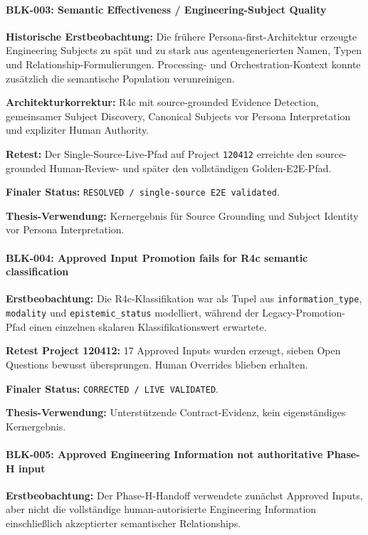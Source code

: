 \paragraph{BLK-003: Semantic Effectiveness / Engineering-Subject Quality}

\textbf{Historische Erstbeobachtung:}
Die frühere Persona-first-Architektur erzeugte Engineering Subjects zu spät und
zu stark aus agentengenerierten Namen, Typen und Relationship-Formulierungen.
Processing- und Orchestration-Kontext konnte zusätzlich die semantische Population
verunreinigen.

\textbf{Architekturkorrektur:}
R4c mit source-grounded Evidence Detection, gemeinsamer Subject Discovery,
Canonical Subjects vor Persona Interpretation und expliziter Human Authority.

\textbf{Retest:}
Der Single-Source-Live-Pfad auf Project \texttt{120412} erreichte den
source-grounded Human-Review- und später den vollständigen Golden-E2E-Pfad.

\textbf{Finaler Status:}
\texttt{RESOLVED / single-source E2E validated}.

\textbf{Thesis-Verwendung:}
Kernergebnis für Source Grounding und Subject Identity vor Persona Interpretation.


\paragraph{BLK-004: Approved Input Promotion fails for R4c semantic classification}

\textbf{Erstbeobachtung:}
Die R4c-Klassifikation war als Tupel aus \texttt{information_type},
\texttt{modality} und \texttt{epistemic_status} modelliert, während der
Legacy-Promotion-Pfad einen einzelnen skalaren Klassifikationswert erwartete.

\textbf{Retest Project 120412:}
17 Approved Inputs wurden erzeugt, sieben Open Questions bewusst übersprungen.
Human Overrides blieben erhalten.

\textbf{Finaler Status:}
\texttt{CORRECTED / LIVE VALIDATED}.

\textbf{Thesis-Verwendung:}
Unterstützende Contract-Evidenz, kein eigenständiges Kernergebnis.


\paragraph{BLK-005: Approved Engineering Information not authoritative Phase-H input}

\textbf{Erstbeobachtung:}
Der Phase-H-Handoff verwendete zunächst Approved Inputs, aber nicht die vollständige
human-autorisierte Engineering Information einschließlich akzeptierter semantischer
Relationships.


